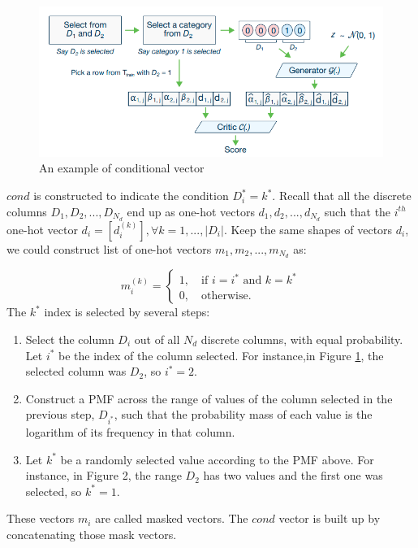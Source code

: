 \documentclass{article}
\begin{document}
\begin{figure}[h]
	\centering
	\includegraphics[scale=0.3]{figures/cond.png}
	\caption{An example of conditional vector}
	\label{fig:cond}
\end{figure}

$cond$ is constructed to indicate the condition $D_i^* = k^*$. Recall that all the discrete columns $D_1, D_2,..., D_{N_d}$ end up as one-hot vectors $d_1, d_2, ..., d_{N_d}$ such that the $i^{th}$ one-hot vector $d_i = [d_i^{(k)}], \forall k={1,..., |D_i|}$. Keep the same shapes of vectors $d_i$, we could construct list of one-hot vectors $m_1, m_2,..., m_{N_d}$ as:

\begin{equation}
	m_i^{(k)} = \begin{cases}
	1, \quad \text{if $i = i^*$ and $k=k^*$}\\
	0, \quad \text{otherwise.}
	\end{cases}
\end{equation}
The $k^*$ index is selected by several steps:
\begin{enumerate}
	\item Select the column $D_i$ out of all $N_d$ discrete columns, with equal probability. Let $i^*$ be the index of the column selected. For instance,in Figure \ref{fig:cond}, the selected column was $D_2$, so $i^* = 2$.
	\item Construct a PMF across the range of values of the column selected in the previous step, $D_{i^*}$, such that the probability mass of each value is the logarithm of its frequency in that column.
	\item Let $k^*$ be a randomly selected value according to the PMF above. For instance, in Figure 2, the range $D_2$ has two values and the first one was selected, so $k^*=1$.
\end{enumerate}

These vectors $m_i$ are called masked vectors. The $cond$ vector is built up by concatenating those mask vectors.
\end{document}
